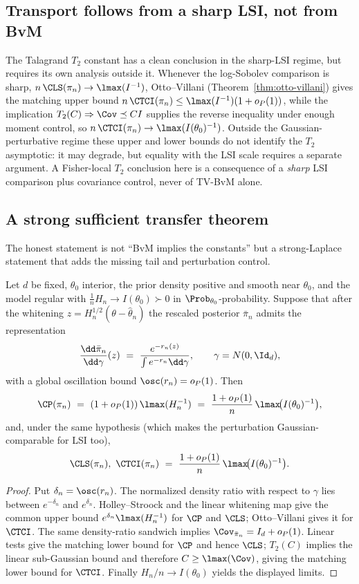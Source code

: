 \documentclass[../../main.tex]{subfiles}
\begin{document}
\subsection{Transport follows from a sharp LSI, not from BvM}
\label{subsec:a2-transport}

The Talagrand $T_2$ constant has a clean conclusion in the sharp-LSI regime, but requires its own
analysis outside it. Whenever the log-Sobolev comparison is sharp,
$n\,\CLS(\pi_n)\to\lmax(I^{-1})$, Otto--Villani
(Theorem~\ref{thm:otto-villani}) gives the matching upper bound
$n\,\CTCI(\pi_n)\le\lmax(I^{-1})(1+o_P(1))$, while the implication
$T_2(C)\Rightarrow\Cov\preceq CI$ supplies the reverse inequality under enough moment
control, so $n\,\CTCI(\pi_n)\to\lmax(I(\theta_0)^{-1})$. Outside the Gaussian-perturbative
regime these upper and lower bounds do not identify the $T_2$ asymptotic: it may degrade, but
equality with the LSI scale requires a separate argument. A Fisher-local $T_2$ conclusion here is
a consequence of a \emph{sharp} LSI comparison plus covariance control, never of TV-BvM alone.

\subsection{A strong sufficient transfer theorem}
\label{subsec:a2-theorem}

The honest statement is not ``BvM implies the constants'' but a strong-Laplace statement that
adds the missing tail and perturbation control.

\begin{theorem}
\label{thm:a2-target}
Let $d$ be fixed, $\theta_0$ interior, the prior density positive and smooth near $\theta_0$,
and the model regular with $\tfrac1n H_n\to I(\theta_0)\succ0$ in $\Prob_{\theta_0}$-probability.
Suppose that after the whitening $z=H_n^{1/2}(\theta-\hat\theta_n)$ the rescaled posterior
$\bar\pi_n$ admits the representation
\[
  \frac{\dd\bar\pi_n}{\dd\gamma}(z)\ =\ \frac{e^{-r_n(z)}}{\int e^{-r_n}\dd\gamma},
  \qquad \gamma=N(0,\Id_d),
\]
with a global oscillation bound $\osc(r_n)=o_P(1)$. Then
\[
  \CP(\pi_n)\ =\ (1+o_P(1))\,\lmax(H_n^{-1})\ =\ \frac{1+o_P(1)}{n}\,\lmax\!\big(I(\theta_0)^{-1}\big),
\]
and, under the same hypothesis (which makes the perturbation Gaussian-comparable for LSI too),
\[
  \CLS(\pi_n),\ \CTCI(\pi_n)\ =\ \frac{1+o_P(1)}{n}\,\lmax\!\big(I(\theta_0)^{-1}\big).
\]
\end{theorem}

\begin{proof}
Put $\delta_n=\osc(r_n)$. The normalized density ratio with respect to $\gamma$ lies between
$e^{-\delta_n}$ and $e^{\delta_n}$. Holley--Stroock and the linear whitening map give the common
upper bound $e^{\delta_n}\lmax(H_n^{-1})$ for $\CP$ and $\CLS$; Otto--Villani gives it for
$\CTCI$. The same density-ratio sandwich implies
$\Cov_{\bar\pi_n}=I_d+o_P(1)$. Linear tests give the matching lower bound for $\CP$ and hence
$\CLS$; $T_2(C)$ implies the linear sub-Gaussian bound and therefore
$C\ge\lmax(\Cov)$, giving the matching lower bound for $\CTCI$. Finally
$H_n/n\to I(\theta_0)$ yields the displayed limits.
\end{proof}
\end{document}
